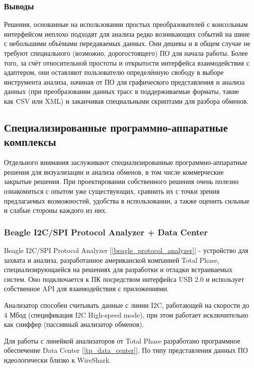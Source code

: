 \subsubsection{Выводы}

Решения, основанные на использовании простых преобразователей с консольным интерфейсом неплохо подходят для анализа редко возникающих событий на шине с небольшими объёмами передаваемых данных. Они дешевы и в общем случае не требуют специального (возможно, дорогостоящего) ПО для начала работы. Более того, за счёт относительной простоты и открытости интерфейса взаимодействия с адаптером, они оставляют пользователю определённую свободу в выборе инструмента анализа, начиная от ПО для графического представления и анализа данных (при преобразовании данных трасс в поддерживаемые форматы, такие как CSV или XML) и заканчивая специальными скриптами для разбора обменов.

\subsection{Специализированные программно-аппаратные комплексы}

Отдельного внимания заслуживают специализированные программно-аппаратные решения для визуализации и анализа обменов, в том числе коммерческие закрытые решения. При проектировании собственного решения очень полезно ознакомиться с опытом уже существующих, сравнить их с точки зрения предлагаемых возможностей, удобства в использовании, а также оценить сильные и слабые стороны каждого из них.

\subsubsection{Beagle I2C/SPI Protocol Analyzer + Data Center}

Beagle I2C/SPI Protocol Analyzer [\ref{beagle_protocol_analyzer}] - устройство для захвата и анализа, разработанное американской компанией Total Phase, специализирующаейся на решениях для разработки и отладки встраиваемых систем. Оно подключается к ПК посредством интерфейса USB 2.0 и использует собственное API для взаимодействия с приложениями.

Анализатор способен считывать данные с линии I2C, работающей на скорости до 4 Мбод (спецификация I2C High-speed mode), при этом работает исключительно как сниффер (пассивный анализатор обменов).

Для работы с линейкой анализаторов от Total Phase разработано программное обеспечение Data Center [\ref{tp_data_center}]. По типу представления данных ПО идеологически близко к WireShark.

